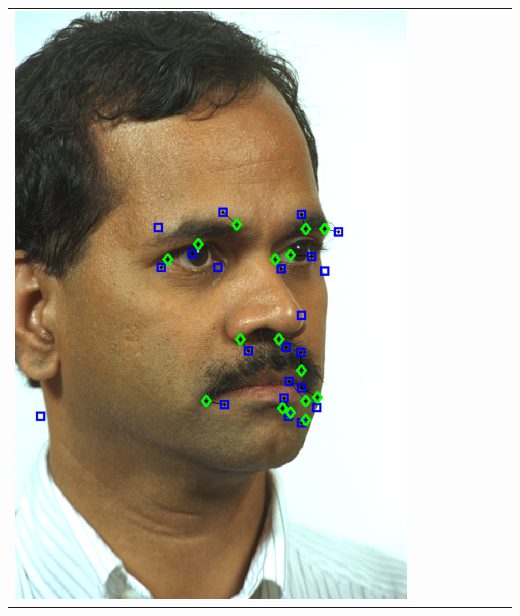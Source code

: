 \documentclass[portrait,final,a0paper,fontscale=0.277]{baposter}
\begin{document}
\begin{poster}
{{\begin{tabular}{@{}rccccccc@{}}
\parbox[c]{0.11\linewidth}{\includegraphics[width=\linewidth]{images/l_qr_fail.pdf}} &

\end{tabular}}}
\end{poster}
\end{document}
